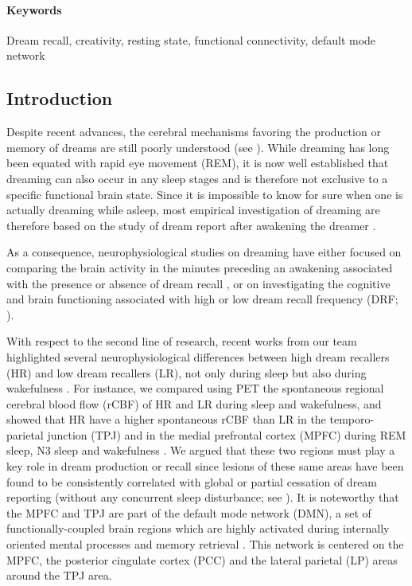 \paragraph{Keywords}
Dream recall, creativity, resting state, functional connectivity, default mode network

\subsection*{Introduction}
\label{res:dmn-crea:intro}
Despite recent advances, the cerebral mechanisms favoring the production or memory of dreams are still poorly understood (see \citealp{ruby_experimental_2011}). While dreaming has long been equated with rapid eye movement (REM), it is now well established that dreaming can also occur in any sleep stages and is therefore not exclusive to a specific functional brain state. Since it is impossible to know for sure when one is actually dreaming while asleep, most empirical investigation of dreaming are therefore based on the study of dream report after awakening the dreamer \citep{schwartz_dreaming:_2005}.

As a consequence, neurophysiological studies on dreaming have either focused on comparing the brain activity in the minutes preceding an awakening associated with the presence or absence of dream recall \citep{esposito_reduced_2004, wittmann_nrem_2004, chellappa_cortical_2011, marzano_recalling_2011, scarpelli_state-_2015, siclari_neural_2017}, or on investigating the cognitive and brain functioning associated with high or low dream recall frequency (DRF; \citealp{eichenlaub_brain_2014, eichenlaub_resting_2014}).

With respect to the second line of research, recent works from our team highlighted several neurophysiological differences between high dream recallers (HR) and low dream recallers (LR), not only during sleep but also during wakefulness \citealp{eichenlaub_brain_2014, eichenlaub_resting_2014, vallat_increased_2017}. For instance, we compared using PET the spontaneous regional cerebral blood flow (rCBF) of HR and LR during sleep and wakefulness, and showed that HR have a higher spontaneous rCBF than LR in the temporo-parietal junction (TPJ) and in the medial prefrontal cortex (MPFC) during REM sleep, N3 sleep and wakefulness \citep{eichenlaub_resting_2014}. We argued that these two regions must play a key role in dream production or recall since lesions of these same areas have been found to be consistently correlated with global or partial cessation of dream reporting (without any concurrent sleep disturbance; see \citealp{solms_neuropsychology_1997}). It is noteworthy that the MPFC and TPJ are part of the default mode network (DMN), a set of functionally-coupled brain regions which are highly activated during internally oriented mental processes and memory retrieval \citep{gusnard_searching_2001, raichle_default_2001}. This network is centered on the MPFC, the posterior cingulate cortex (PCC) and the lateral parietal (LP) areas around the TPJ area.

